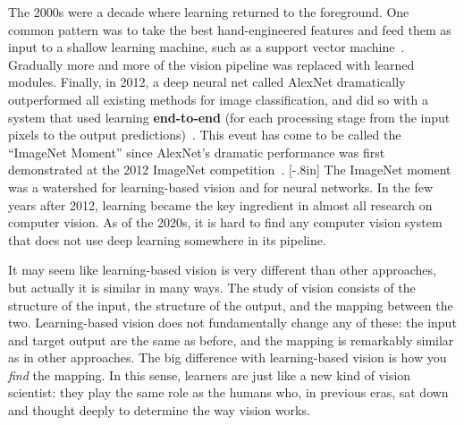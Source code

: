 The 2000s were a decade where learning returned to the foreground. One common pattern was to take the best hand-engineered features and feed them as input to a shallow learning machine, such as a support vector machine~\cite{cortes1995support}. Gradually more and more of the vision pipeline was replaced with learned modules. Finally, in 2012, a deep neural net called AlexNet dramatically outperformed all existing methods for image classification, and did so with a system that used learning \textbf{end-to-end} (for each processing stage from the input pixels to the output predictions)~\cite{krizhevsky2012imagenet}. This event has come to be called the ``ImageNet Moment'' since AlexNet's dramatic performance was first demonstrated at the 2012 ImageNet competition~\cite{russakovsky2015imagenet}.
[-.8in]
The ImageNet moment was a watershed for learning-based vision and for neural networks. In the few years after 2012, learning became the key ingredient in almost all research on computer vision. As of the 2020s, it is hard to find any computer vision system that does not use deep learning somewhere in its pipeline.

It may seem like learning-based vision is very different than other approaches, but actually it is similar in many ways. The study of vision consists of the structure of the input, the structure of the output, and the mapping between the two. Learning-based vision does not fundamentally change any of these: the input and target output are the same as before, and the mapping is remarkably similar as in other approaches. The big difference with learning-based vision is how you \textit{find} the mapping. In this sense, learners are just like a new kind of vision scientist: they play the same role as the humans who, in previous eras, sat down and thought deeply to determine the way vision works.


